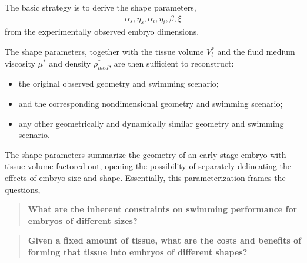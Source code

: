 \documentclass[10pt,a4paper]{article}
\def\Vts{V_t^*}
\begin{document}
The basic strategy is to derive the shape parameters, 
\begin{eqnarray}\label{shapars}
	\alpha_s, \eta_s, \alpha_{i}, \eta_{i}, \beta, \xi
\end{eqnarray}
from the experimentally observed embryo dimensions.


The shape parameters, together with the tissue volume $\Vts$ and the fluid medium viscosity $\mu^*$ and density $\rho_{med}^*$, are then sufficient to reconstruct:
\begin{itemize}
	\item the original observed geometry and swimming scenario;
	\item and the corresponding nondimensional geometry and swimming scenario;
	\item any other geometrically and dynamically similar geometry and swimming scenario.
\end{itemize}
The shape parameters summarize the geometry of an early stage embryo with tissue volume factored out, opening the possibility of separately delineating the effects of embryo size and shape.
Essentially, this parameterization frames the questions,
\begin{quotation}
	\textbf{What are the inherent constraints on swimming performance for embryos of different sizes?}
\end{quotation}
\begin{quotation}
	\textbf{Given a fixed amount of tissue, what are the costs and benefits of forming that tissue into embryos of different shapes?}
\end{quotation}
\end{document}
